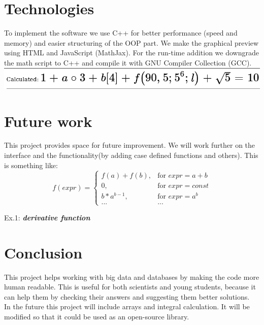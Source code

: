 \documentclass[12pt]{article}
\begin{document}
		\section{Technologies}
		To implement the software we use C++ for better performance (speed and memory) and easier structuring of the OOP part. We make the graphical preview using HTML and JavaScript (MathJax). For the run-time addition we downgrade the math script to C++ and compile it with GNU Compiler Collection (GCC). \\
		{\centering\includegraphics[scale=0.5]{screeenshot_SRS.png}}
		\section{Future work}
		This project provides space for future improvement. We will work further on the interface and the functionality(by adding case defined functions and others). This is something like:\\
		\[
		  f (expr) = \left\{\begin{array}{ll}
		  f (a) + f (b), & \text{for } expr = a + b\\
		  0, & \text{for } expr = const\\
		  b * a ^ {b - 1}, & \text{for } expr = a ^ b\\
		  ... & ...
		  \end{array} \right.
		\]
		{\begin{center} Ex.1: \textbf{\textit{derivative function}}\end{center}}
		\section{Conclusion}
		This project helps working with big data and databases by making the code more human readable. This is useful for both scientists and young students, because it can help them by checking their answers and suggesting them better solutions. \\
		In the future this project will include arrays and integral calculation. It will be modified so that it could be used as an open-source library. \\
\end{document}
